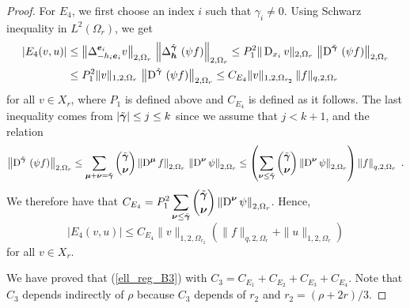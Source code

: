\begin{proof}
For $E_4$, we first choose an index $i$ such that $\gamma_i \neq 0$.
Using Schwarz inequality in $\displaystyle L^2(\Omega_r)$, we get
\begin{align*}
\left| E_4(v,u) \right| &\leq
\left\| \Delta_{-h_i {\bm{e}}_i}^{{\bm{e}}_i} v \right\|_{2,\Omega_r} \,
\left\| \Delta_{{\bm{h}}}^{\tilde{{\bm{\gamma}}}}\,\left( \psi f \right)
\right\|_{2,\Omega_r}
\leq P_1^2 \|\operatorname{D}_{x_i} v \|_{2,\Omega_r} \,
\left\| \operatorname{D}^{\tilde{{\bm{\gamma}}}}\,\left( \psi f \right)
\right\|_{2,\Omega_r} \\
&\leq P_1^2 \|v \|_{1,2,\Omega_r} \,
\left\| \operatorname{D}^{\tilde{{\bm{\gamma}}}}\,\left( \psi f \right) \right\|_{2,\Omega_r}
\leq C_{E_4} \|v \|_{1,2,\Omega_{r_2}} \, \| f \|_{q,2,\Omega_r}
\end{align*}
for all $v \in X_r$, where $P_1$ is defined above and $C_{E_4}$ is
defined as it follows.  The last inequality comes from
$|\tilde{{\bm{\gamma}}}| \leq j \leq k$ since 
we assume that $j < k+1$, and the relation
\[
\left\| \operatorname{D}^{\tilde{{\bm{\gamma}}}}\,\left( \psi f \right) \right\|_{2,\Omega_r}
\leq \sum_{{\bm{\mu}}+{\bm{\nu}}=\tilde{{\bm{\gamma}}}}
\binom{\tilde{{\bm{\gamma}}}}{{\bm{\nu}}}
\left\| \operatorname{D}^{{\bm{\mu}}} f \right\|_{2,\Omega_r}\,
\left\|\operatorname{D}^{{\bm{\nu}}} \psi \right\|_{2,\Omega_r}
\leq \left( \sum_{{\bm{\nu}} \leq\tilde{{\bm{\gamma}}}}
\binom{\tilde{{\bm{\gamma}}}}{{\bm{\nu}}}
\left\|\operatorname{D}^{{\bm{\nu}}} \psi \right\|_{2,\Omega_r} \right)
\left\| f \right\|_{q,2,\Omega_r} \ .
\]
We therefore have that $\displaystyle C_{E_4} = P_1^2 
\sum_{{\bm{\nu}} \leq\tilde{{\bm{\gamma}}}} \binom{\tilde{{\bm{\gamma}}}}{{\bm{\nu}}}
\left\|\operatorname{D}^{{\bm{\nu}}} \psi \right\|_{2,\Omega_r}$.  Hence,
\[
\left| E_4(v,u) \right| \leq C_{E_4} \|v\|_{1,2,\Omega_{r_2}}
\left( \|f\|_{q,2,\Omega_r} + \|u\|_{1,2,\Omega_r} \right)
\]
for all $v \in X_r$.

We have proved that (\ref{ell_reg_B3}) with
$C_3 = C_{E_1} + C_{E_2} + C_{E_3} + C_{E_4}$.  Note that $C_3$
depends indirectly of $\rho$ because $C_3$ depends of $r_2$ and
$r_2 = (\rho + 2r)/3$.


\end{proof}
